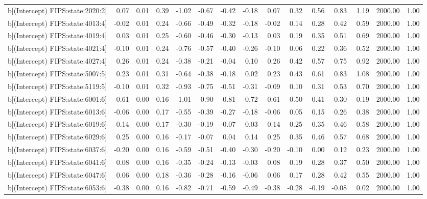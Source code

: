 \begin{table}[ht]
\begin{tabular}{rrrrrrrrrrrrrrr}
  b[(Intercept) FIPS:state:2020:2] & 0.07 & 0.01 & 0.39 & -1.02 & -0.67 & -0.42 & -0.18 & 0.07 & 0.32 & 0.56 & 0.83 & 1.19 & 2000.00 & 1.00 \\ 
  b[(Intercept) FIPS:state:4013:4] & -0.02 & 0.01 & 0.24 & -0.66 & -0.49 & -0.32 & -0.18 & -0.02 & 0.14 & 0.28 & 0.42 & 0.59 & 2000.00 & 1.00 \\ 
  b[(Intercept) FIPS:state:4019:4] & 0.03 & 0.01 & 0.25 & -0.60 & -0.46 & -0.30 & -0.13 & 0.03 & 0.19 & 0.35 & 0.51 & 0.69 & 2000.00 & 1.00 \\ 
  b[(Intercept) FIPS:state:4021:4] & -0.10 & 0.01 & 0.24 & -0.76 & -0.57 & -0.40 & -0.26 & -0.10 & 0.06 & 0.22 & 0.36 & 0.52 & 2000.00 & 1.00 \\ 
  b[(Intercept) FIPS:state:4027:4] & 0.26 & 0.01 & 0.24 & -0.38 & -0.21 & -0.04 & 0.10 & 0.26 & 0.42 & 0.57 & 0.75 & 0.92 & 2000.00 & 1.00 \\ 
  b[(Intercept) FIPS:state:5007:5] & 0.23 & 0.01 & 0.31 & -0.64 & -0.38 & -0.18 & 0.02 & 0.23 & 0.43 & 0.61 & 0.83 & 1.08 & 2000.00 & 1.00 \\ 
  b[(Intercept) FIPS:state:5119:5] & -0.10 & 0.01 & 0.32 & -0.93 & -0.75 & -0.51 & -0.31 & -0.09 & 0.10 & 0.31 & 0.53 & 0.70 & 2000.00 & 1.00 \\ 
  b[(Intercept) FIPS:state:6001:6] & -0.61 & 0.00 & 0.16 & -1.01 & -0.90 & -0.81 & -0.72 & -0.61 & -0.50 & -0.41 & -0.30 & -0.19 & 2000.00 & 1.00 \\ 
  b[(Intercept) FIPS:state:6013:6] & -0.06 & 0.00 & 0.17 & -0.55 & -0.39 & -0.27 & -0.18 & -0.06 & 0.05 & 0.15 & 0.26 & 0.38 & 2000.00 & 1.00 \\ 
  b[(Intercept) FIPS:state:6019:6] & 0.14 & 0.00 & 0.17 & -0.30 & -0.19 & -0.07 & 0.03 & 0.14 & 0.25 & 0.35 & 0.46 & 0.58 & 2000.00 & 1.00 \\ 
  b[(Intercept) FIPS:state:6029:6] & 0.25 & 0.00 & 0.16 & -0.17 & -0.07 & 0.04 & 0.14 & 0.25 & 0.35 & 0.46 & 0.57 & 0.68 & 2000.00 & 1.00 \\ 
  b[(Intercept) FIPS:state:6037:6] & -0.20 & 0.00 & 0.16 & -0.59 & -0.51 & -0.40 & -0.30 & -0.20 & -0.10 & 0.00 & 0.12 & 0.23 & 2000.00 & 1.00 \\ 
  b[(Intercept) FIPS:state:6041:6] & 0.08 & 0.00 & 0.16 & -0.35 & -0.24 & -0.13 & -0.03 & 0.08 & 0.19 & 0.28 & 0.37 & 0.50 & 2000.00 & 1.00 \\ 
  b[(Intercept) FIPS:state:6047:6] & 0.06 & 0.00 & 0.18 & -0.36 & -0.28 & -0.16 & -0.06 & 0.06 & 0.17 & 0.28 & 0.42 & 0.55 & 2000.00 & 1.00 \\ 
  b[(Intercept) FIPS:state:6053:6] & -0.38 & 0.00 & 0.16 & -0.82 & -0.71 & -0.59 & -0.49 & -0.38 & -0.28 & -0.19 & -0.08 & 0.02 & 2000.00 & 1.00 \\ 

\end{tabular}
\end{table}
